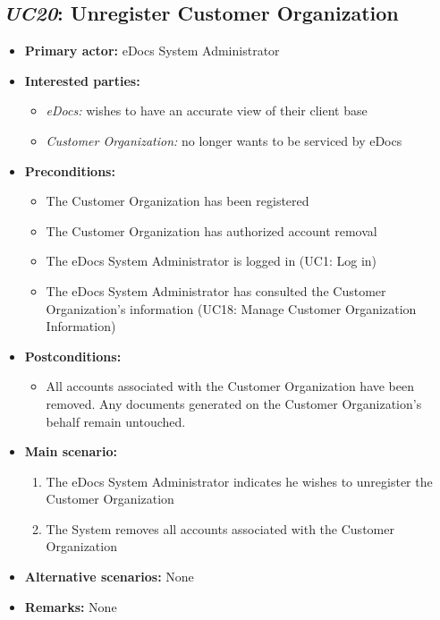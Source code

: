 \documentclass[a4paper,10pt]{article}
\begin{document}
\subsection{\emph{UC20}: Unregister Customer Organization}
\begin{itemize}
	\item \textbf{Primary actor:} eDocs System Administrator
	\item \textbf{Interested parties:} 
	\begin{itemize}
		\item \textit{eDocs:} wishes to have an accurate view of their client base
		\item \textit{Customer Organization:} no longer wants to be serviced by eDocs
	\end{itemize}
	
	\item \textbf{Preconditions:}
	\begin{itemize}
		\item The Customer Organization has been registered
		\item The Customer Organization has authorized account removal
		\item The eDocs System Administrator is logged in (UC1: Log in)
		\item The eDocs System Administrator has consulted the Customer Organization's information (UC18: Manage Customer Organization Information)
	\end{itemize}
	
	\item \textbf{Postconditions:}
	\begin{itemize}
		\item All accounts associated with the Customer Organization have been removed. Any documents generated on the Customer Organization's behalf remain untouched.
	\end{itemize}
	
	\item \textbf{Main scenario:} 
	\begin{enumerate}
		\item The eDocs System Administrator indicates he wishes to unregister the Customer Organization
		\item The System removes all accounts associated with the Customer Organization
	\end{enumerate}
	
	\item \textbf{Alternative scenarios:} 
	None
	
	\item \textbf{Remarks:}
	None
\end{itemize}
\end{document}
